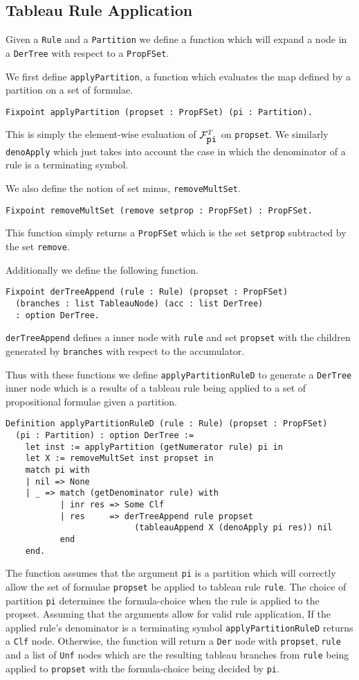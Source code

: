 \documentclass{llncs}
\begin{document}
\subsection{Tableau Rule Application}
%
Given a \verb+Rule+ and a \verb+Partition+ we define a function which will
expand a node in a \verb+DerTree+ with respect to a \verb+PropFSet+.

We first define \verb+applyPartition+, a function which evaluates the map
defined by a partition on a set of formulae.
%
\begin{verbatim}
Fixpoint applyPartition (propset : PropFSet) (pi : Partition).
\end{verbatim}
%
This is simply the element-wise evaluation of $\mathcal{F}_{\verb+pi+}^{T}$ on
\verb+propset+. We similarly \verb+denoApply+ which just takes into account the
case in which the denominator of a rule is a terminating symbol.

We also define the notion of set minus, \verb+removeMultSet+.
%
\begin{verbatim}
Fixpoint removeMultSet (remove setprop : PropFSet) : PropFSet.
\end{verbatim}
%
This function simply returns a \verb+PropFSet+ which is the set \verb+setprop+
subtracted by the set \verb+remove+.

Additionally we define the following function.
%
\begin{verbatim}
Fixpoint derTreeAppend (rule : Rule) (propset : PropFSet)
  (branches : list TableauNode) (acc : list DerTree)
  : option DerTree.
\end{verbatim}
%
\verb+derTreeAppend+ defines a inner node with \verb+rule+ and set
\verb+propset+ with the children generated by \verb+branches+ with respect to
the accumulator.

Thus with these functions we define \verb+applyPartitionRuleD+ to generate a
\verb+DerTree+ inner node which is a results of a tableau rule being applied to
a set of propositional formulae given a partition.
%
\begin{verbatim}
Definition applyPartitionRuleD (rule : Rule) (propset : PropFSet)
  (pi : Partition) : option DerTree :=
    let inst := applyPartition (getNumerator rule) pi in
    let X := removeMultSet inst propset in
    match pi with
    | nil => None
    | _ => match (getDenominator rule) with
           | inr res => Some Clf
           | res     => derTreeAppend rule propset
                          (tableauAppend X (denoApply pi res)) nil
           end
    end.
\end{verbatim}
%
The function assumes that the argument \verb+pi+ is a partition which will
correctly allow the set of formulae \verb+propset+ be applied to tableau rule
\verb+rule+. The choice of partition \verb+pi+ determines the formula-choice
when the rule is applied to the propset. Assuming that the arguments allow for
valid rule application, If the applied rule's denominator is a terminating
symbol \verb+applyPartitionRuleD+ returns a \verb+Clf+ node. Otherwise, the
function will return a \verb+Der+ node with \verb+propset+, \verb+rule+ and
a list of \verb+Unf+ nodes which are the resulting tableau branches from
\verb+rule+ being applied to \verb+propset+ with the formula-choice being
decided by \verb+pi+.
%
\end{document}
